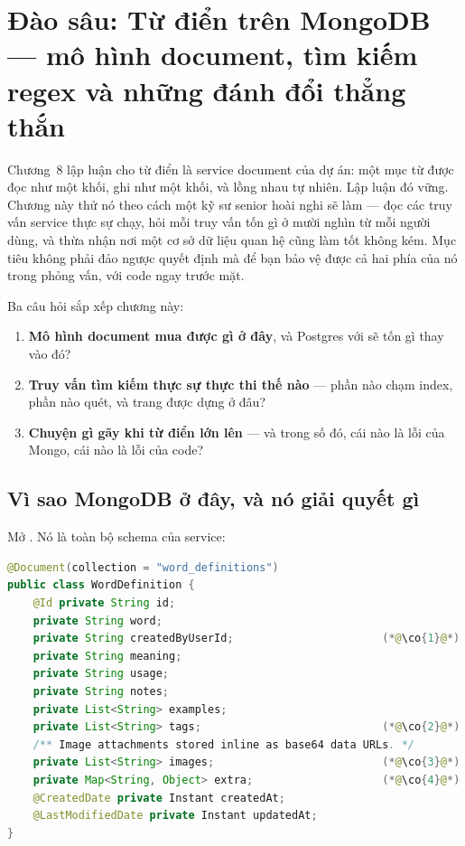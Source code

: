 \chapter{Đào sâu: Từ điển trên MongoDB --- mô hình document, tìm kiếm regex và những đánh đổi thẳng thắn}
\label{ch:dd-mongo}

Chương~8 lập luận cho từ điển là service document của dự án: một mục từ
được đọc như một khối, ghi như một khối, và lồng nhau tự nhiên. Lập luận
đó vững. Chương này thử nó theo cách một kỹ sư senior hoài nghi sẽ làm
--- đọc các truy vấn service thực sự chạy, hỏi mỗi truy vấn tốn gì ở
mười nghìn từ mỗi người dùng, và thừa nhận nơi một cơ sở dữ liệu quan
hệ cũng làm tốt không kém. Mục tiêu không phải đảo ngược quyết định mà
để bạn bảo vệ được cả hai phía của nó trong phỏng vấn, với code ngay
trước mặt.

Ba câu hỏi sắp xếp chương này:

\begin{enumerate}
  \item \textbf{Mô hình document mua được gì ở đây}, và Postgres với
   sẽ tốn gì thay vào đó?
  \item \textbf{Truy vấn tìm kiếm thực sự thực thi thế nào} --- phần nào
  chạm index, phần nào quét, và trang được dựng ở đâu?
  \item \textbf{Chuyện gì gãy khi từ điển lớn lên} --- và trong số đó,
  cái nào là lỗi của Mongo, cái nào là lỗi của code?
\end{enumerate}

\section{Vì sao MongoDB ở đây, và nó giải quyết gì}

Mở . Nó là toàn bộ schema của service:

\begin{lstlisting}[language=Java]
@Document(collection = "word_definitions")
public class WordDefinition {
    @Id private String id;
    private String word;
    private String createdByUserId;                       (*@\co{1}@*)
    private String meaning;
    private String usage;
    private String notes;
    private List<String> examples;
    private List<String> tags;                            (*@\co{2}@*)
    /** Image attachments stored inline as base64 data URLs. */
    private List<String> images;                          (*@\co{3}@*)
    private Map<String, Object> extra;                    (*@\co{4}@*)
    @CreatedDate private Instant createdAt;
    @LastModifiedDate private Instant updatedAt;
}
\end{lstlisting}

